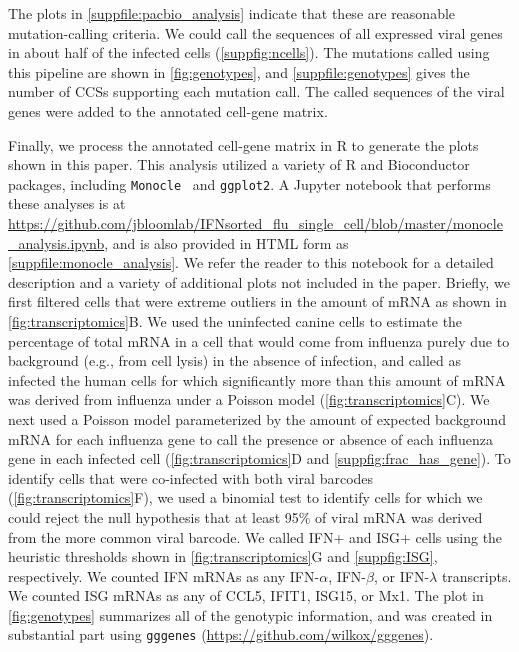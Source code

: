 \documentclass[lineno]{asm-article}
\newcommand{\FIG}[1]{\autoref{fig:#1}}
\newcommand{\SUPPFILE}[1]{\autoref{suppfile:#1}}
\newcommand{\SUPPFIG}[1]{\autoref{suppfig:#1}}
\begin{document}
The plots in \SUPPFILE{pacbio_analysis} indicate that these are reasonable mutation-calling criteria.
We could call the sequences of all expressed viral genes in about half of the infected cells (\SUPPFIG{ncells}).
The mutations called using this pipeline are shown in \FIG{genotypes}, and \SUPPFILE{genotypes} gives the number of CCSs supporting each mutation call.
The called sequences of the viral genes were added to the annotated cell-gene matrix.

Finally, we process the annotated cell-gene matrix in R to generate the plots shown in this paper.
This analysis utilized a variety of R and Bioconductor~\cite{huber2015orchestrating} packages, including \texttt{Monocle}~\cite{qiu2017reversed, trapnell2014dynamics} and \texttt{ggplot2}.
A Jupyter notebook that performs these analyses is at \url{https://github.com/jbloomlab/IFNsorted_flu_single_cell/blob/master/monocle_analysis.ipynb}, and is also provided in HTML form as \SUPPFILE{monocle_analysis}.
We refer the reader to this notebook for a detailed description and a variety of additional plots not included in the paper.
Briefly, we first filtered cells that were extreme outliers in the amount of mRNA as shown in \FIG{transcriptomics}B.
We used the uninfected canine cells to estimate the percentage of total mRNA in a cell that would come from influenza purely due to background (e.g., from cell lysis) in the absence of infection, and called as infected the human cells for which significantly more than this amount of mRNA was derived from influenza under a Poisson model (\FIG{transcriptomics}C).
We next used a Poisson model parameterized by the amount of expected background mRNA for each influenza gene to call the presence or absence of each influenza gene in each infected cell (\FIG{transcriptomics}D and \SUPPFIG{frac_has_gene}). 
To identify cells that were co-infected with both viral barcodes (\FIG{transcriptomics}F), we used a binomial test to identify cells for which we could reject the null hypothesis that at least 95\% of viral mRNA was derived from the more common viral barcode.
We called IFN+ and ISG+ cells using the heuristic thresholds shown in \FIG{transcriptomics}G and \SUPPFIG{ISG}, respectively.
We counted IFN mRNAs as any IFN-$\alpha$, IFN-$\beta$, or IFN-$\lambda$ transcripts.
We counted ISG mRNAs as any of CCL5, IFIT1, ISG15, or Mx1.
The plot in \FIG{genotypes} summarizes all of the genotypic information, and was created in substantial part using \texttt{gggenes} (\url{https://github.com/wilkox/gggenes}).
\end{document}

